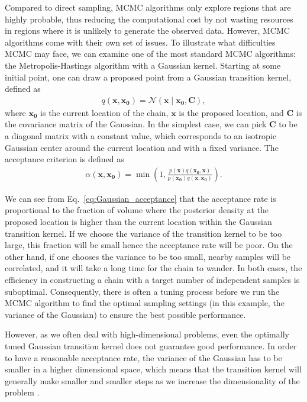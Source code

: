 \documentclass[twocolumn]{aastex631}
\begin{document}
Compared to direct sampling, MCMC algorithms only explore regions that are
highly probable, thus reducing the computational cost by not wasting resources
in regions where it is unlikely to generate the observed data. However, MCMC
algorithms come with their own set of issues. To illustrate what difficulties
MCMC may face, we can examine one of the most standard MCMC algorithms: the
Metropolis-Hastings algorithm with a Gaussian kernel. Starting at some initial
point, one can draw a proposed point from a Gaussian transition kernel, defined
as
\begin{align}
    q(\mathbf{x},\mathbf{x_0})= \mathcal{N}(\mathbf{x} \mid \mathbf{x_0},\mathbf{C}),
\end{align}
where $\mathbf{x_0}$ is the current location of the chain, $\mathbf{x}$ is the
proposed location, and $\mathbf{C}$ is the covariance matrix of the Gaussian. In
the simplest case, we can pick $\mathbf{C}$ to be a diagonal matrix with a
constant value, which corresponds to an isotropic Gaussian center around the
current location and with a fixed variance. The acceptance criterion is
defined as
\begin{align}
\alpha(\mathbf{x},\mathbf{x_0}) = \min\left(1,\frac{p(\mathbf{x})q(\mathbf{x_0},\mathbf{x})}{p(\mathbf{x_0})q(\mathbf{x},\mathbf{x_0})}\right).
\label{eq:Gaussian_acceptance}
\end{align}

We can see from Eq.~\eqref{eq:Gaussian_acceptance} that the acceptance rate is
proportional to the fraction of volume where the posterior density at the
proposed location is higher than the current location within the Gaussian
transition kernel. If we choose the variance of the transition kernel to be too
large, this fraction will be small hence the acceptance rate will be poor. On
the other hand, if one chooses the variance to be too small, nearby samples
will be correlated, and it will take a long time for the chain to wander. In
both cases, the efficiency in constructing a chain with a target number of
independent samples is suboptimal. Consequently, there is often a tuning
process before we run the MCMC algorithm to find the optimal sampling settings
(in this example, the variance of the Gaussian) to ensure the best possible
performance.

However, as we often deal with high-dimensional problems, even the optimally
tuned Gaussian transition kernel does not guarantee good performance. In order
to have a reasonable acceptance rate, the variance of the Gaussian has to be
smaller in a higher dimensional space, which means that the transition kernel will generally make smaller and smaller steps as we increase the dimensionality of the problem
\cite{2017arXiv170102434B}.
\end{document}
